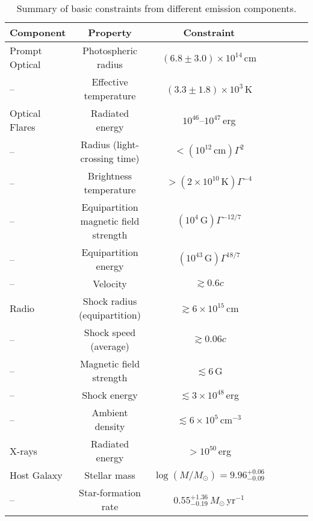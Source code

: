 \documentclass{nature_plusfigure}
\begin{document}
\begin{table}
\begin{center}
\caption{Summary of basic constraints from different emission components.}
\label{tab:flare-searches}
\begin{tabular}{lcccccc} 
\hline\hline
Component & Property & Constraint \\
\hline
Prompt Optical & Photospheric radius & $(6.8\pm3.0)\times10^{14}\,$cm \\
-- & Effective temperature & $(3.3\pm1.8)\times10^{3}\,$K \\
Optical Flares & Radiated energy & $10^{46}$--$10^{47}\,$erg \\
-- & Radius (light-crossing time) & $<(10^{12}\,\mathrm{cm})\Gamma^2$ \\
-- & Brightness temperature & $>(2\times10^{10}\,\mathrm{K})\Gamma^{-4}$ \\
-- & Equipartition magnetic field strength & $(10^{4}\,\mathrm{G})\Gamma^{-12/7}$ \\
-- & Equipartition energy & $(10^{43}\,\mathrm{G})\Gamma^{18/7}$ \\
-- & Velocity & $\gtrsim0.6c$ \\
Radio & Shock radius (equipartition) & $\gtrsim6\times10^{15}\,$cm \\
-- & Shock speed (average) & $\gtrsim0.06c$ \\
-- & Magnetic field strength & $\lesssim6$\,G \\
-- & Shock energy & $\lesssim3\times10^{48}\,$erg \\
-- & Ambient density & $\lesssim6\times10^{5}\,$cm$^{-3}$ \\
X-rays & Radiated energy & $>10^{50}$\,erg \\
Host Galaxy & Stellar mass & $\log(M/M_\odot)=9.96^{+0.06}_{-0.09}$ \\
-- & Star-formation rate & $0.55^{+1.36}_{-0.19}\,M_\odot\,$yr$^{-1}$ \\
\hline
\end{tabular}
\end{center}
\end{table}

\clearpage


%
%
\end{document}
